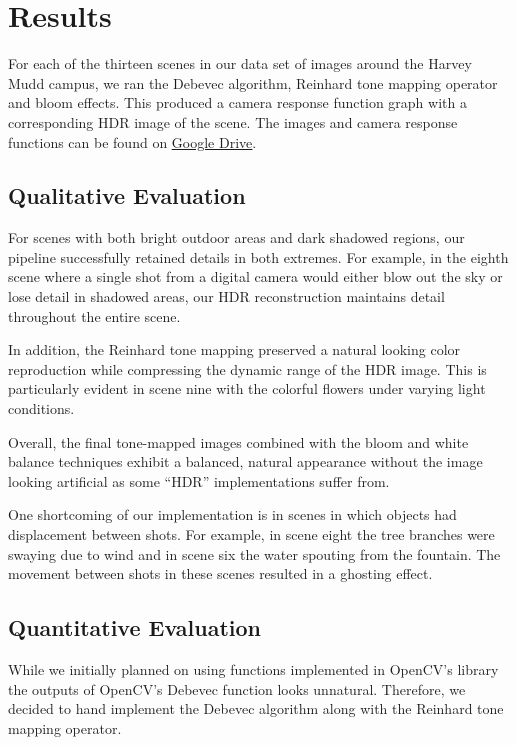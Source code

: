 \documentclass[
	a4paper, %
	10pt, %
	unnumberedsections, %
	twoside, %
]{LTJournalArticle}
\begin{document}
\section{Results}
For each of the thirteen scenes in our data set of images around the Harvey Mudd campus, we ran the Debevec algorithm, Reinhard tone mapping operator and bloom effects. This produced a camera response function graph with a corresponding HDR image of the scene. The images and camera response functions can be found on \underline{\textcolor{blue}{\href{https://drive.google.com/drive/folders/1Jsv7LVcdsvOUPuSliDZ4YODO_5oRG9gu?usp=share_link}{Google Drive}}}.

\subsection{Qualitative Evaluation}
For scenes with both bright outdoor areas and dark shadowed regions, our pipeline successfully retained details in both extremes. For example, in the eighth scene where a single shot from a digital camera would either blow out the sky or lose detail in shadowed areas, our HDR reconstruction maintains detail throughout the entire scene.

In addition, the Reinhard tone mapping preserved a natural looking color reproduction while compressing the dynamic range of the HDR image. This is particularly evident in scene nine with the colorful flowers under varying light conditions.

Overall, the final tone-mapped images combined with the bloom and white balance techniques exhibit a balanced, natural appearance without the image looking artificial as some “HDR” implementations suffer from.

One shortcoming of our implementation is in scenes in which objects had displacement between shots. For example, in scene eight the tree branches were swaying due to wind and in scene six the water spouting from the fountain. The movement between shots in these scenes resulted in a ghosting effect.


\subsection{Quantitative Evaluation}

While we initially planned on using functions implemented in OpenCV’s library the outputs of OpenCV’s Debevec function looks unnatural. Therefore, we decided to hand implement the Debevec algorithm along with the Reinhard tone mapping operator.
\end{document}
